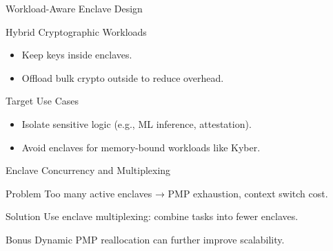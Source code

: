 \documentclass[aspectratio=169]{beamer}
\begin{document}


\begin{frame}{Workload-Aware Enclave Design}
\begin{block}{Hybrid Cryptographic Workloads}
\begin{itemize}
    \item Keep keys inside enclaves.
    \item Offload bulk crypto outside to reduce overhead.
\end{itemize}
\end{block}

\begin{block}{Target Use Cases}
\begin{itemize}
    \item Isolate sensitive logic (e.g., ML inference, attestation).
    \item Avoid enclaves for memory-bound workloads like Kyber.
\end{itemize}
\end{block}
\end{frame}

\begin{frame}{Enclave Concurrency and Multiplexing}
\begin{block}{Problem}
Too many active enclaves → PMP exhaustion, context switch cost.
\end{block}
\begin{alertblock}{Solution}
Use enclave multiplexing: combine tasks into fewer enclaves.
\end{alertblock}
\begin{block}{Bonus}
Dynamic PMP reallocation can further improve scalability.
\end{block}
\end{frame}
\end{document}
